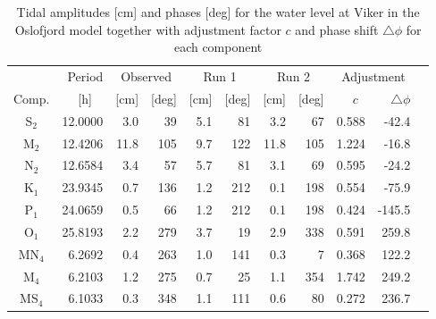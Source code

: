 \begin{table}[ht]
\caption{Tidal amplitudes [cm] and phases [deg] for the water level at Viker in the Oslofjord model together with adjustment factor $c$ and phase shift $\triangle \phi$ for each component}
\label{tab:Viker}
\centering
\begin{tabular}{crrrrrrrrrr} \hline
       & Period & \multicolumn{2}{c}{Observed} & \multicolumn{2}{c}{Run 1} & \multicolumn{2}{c}{Run 2} & \multicolumn{2}{c}{Adjustment} \\
Comp.  & [h] $\;\;$ & [cm] & [deg] & [cm] & [deg] & [cm] & [deg] & $c\;\;$ & $\triangle \phi$  \\ \hline 
S$_2$  &  12.0000 &   3.0 &  39 &    5.1 &  81 &    3.2 &  67 &    0.588 &   -42.4   \\
M$_2$  &  12.4206 &  11.8 & 105 &    9.7 & 122 &   11.8 & 105 &    1.224 &   -16.8   \\
N$_2$  &  12.6584 &   3.4 &  57 &    5.7 &  81 &    3.1 &  69 &    0.595 &   -24.2   \\
K$_1$  &  23.9345 &   0.7 & 136 &    1.2 & 212 &    0.1 & 198 &    0.554 &   -75.9   \\
P$_1$  &  24.0659 &   0.5 &  66 &    1.2 & 212 &    0.1 & 198 &    0.424 &  -145.5   \\
O$_1$  &  25.8193 &   2.2 & 279 &    3.7 &  19 &    2.9 & 338 &    0.591 &   259.8   \\
MN$_4$ &   6.2692 &   0.4 & 263 &    1.0 & 141 &    0.3 &   7 &    0.368 &   122.2   \\
M$_4$  &   6.2103 &   1.2 & 275 &    0.7 &  25 &    1.1 & 354 &    1.742 &   249.2   \\
MS$_4$ &   6.1033 &   0.3 & 348 &    1.1 & 111 &    0.6 &  80 &    0.272 &   236.7   \\ \hline
\end{tabular}
\end{table}



